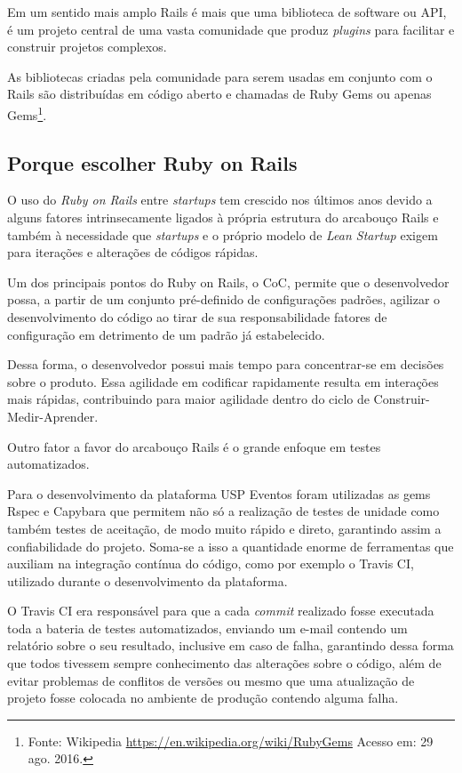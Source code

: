     \par Em um sentido mais amplo Rails é mais que uma biblioteca de software ou API, é um projeto central de uma vasta comunidade que produz \emph{plugins} para facilitar e construir projetos complexos.
	\par As bibliotecas criadas pela comunidade para serem usadas em conjunto com o Rails são distribuídas em código aberto e chamadas de Ruby Gems ou apenas Gems\footnote{Fonte: Wikipedia \url{https://en.wikipedia.org/wiki/RubyGems} Acesso em: 29 ago. 2016.}.
\subsection{Porque escolher Ruby on Rails }
\par O uso do \emph{Ruby on Rails} entre \emph{startups} tem crescido nos últimos anos devido a alguns fatores intrinsecamente ligados à própria estrutura do arcabouço Rails e também à necessidade que \emph{startups} e o próprio modelo de \emph{Lean Startup} exigem para iterações e alterações de códigos rápidas. \citep{lilia:16}
\par Um dos principais pontos do Ruby on Rails, o CoC, permite que o desenvolvedor possa, a partir de um conjunto pré-definido de configurações padrões, agilizar o desenvolvimento do código ao tirar de sua responsabilidade fatores de configuração em detrimento de um padrão já estabelecido. \citep{morrice:15}
\par Dessa forma, o desenvolvedor possui mais tempo para concentrar-se em decisões sobre o produto. Essa agilidade em codificar rapidamente resulta em interações mais rápidas, contribuindo para maior agilidade dentro do ciclo de Construir-Medir-Aprender.
\par Outro fator a favor do arcabouço Rails é o grande enfoque em testes automatizados. \citep{morrice:15}
\par Para o desenvolvimento da plataforma USP Eventos foram utilizadas as gems Rspec e Capybara que permitem não só a realização de testes de unidade como também testes de aceitação, de modo muito rápido e direto, garantindo assim a confiabilidade do projeto. Soma-se a isso a quantidade enorme de ferramentas que auxiliam na integração contínua do código, como por exemplo o Travis CI, utilizado durante o desenvolvimento da plataforma.
\par O Travis CI era responsável para que a cada \emph{commit} realizado fosse executada toda a bateria de testes automatizados, enviando um e-mail contendo um relatório sobre o seu resultado, inclusive em caso de falha, garantindo dessa forma que todos tivessem sempre conhecimento das alterações sobre o código, além de evitar problemas de conflitos de versões ou mesmo que uma atualização de projeto fosse colocada no ambiente de produção contendo alguma falha.

